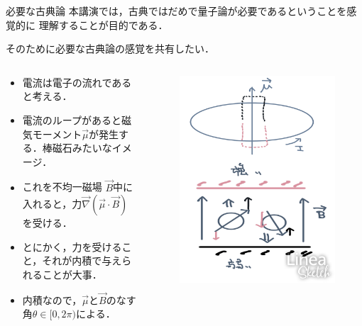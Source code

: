 \documentclass[dvipdfmx]{beamer}
\theoremstyle{break}
\begin{document}
\begin{frame}{必要な古典論}
		本講演では，古典ではだめで量子論が必要であるということを感覚的に
		理解することが目的である．

		そのために必要な古典論の感覚を共有したい．

		\begin{columns}
				\begin{column}{0.7\textwidth}
						\begin{itemize}
								\item 電流は電子の流れであると考える．
								\item 電流のループがあると磁気モーメント$\vec{\mu}$が発生する．棒磁石みたいなイメージ．
								\item これを不均一磁場
										$\vec{B}$中に入れると，力$\vec{\nabla}(\vec{\mu}\cdot\vec{B})$を受ける．
								\item とにかく，\alert{力を受ける}こと，それが\alert{内積}で与えられることが大事．
								\item 内積なので，$\vec{\mu}$と$\vec{B}$のなす角$\theta\in[0, 2\pi)$による．
						\end{itemize}
				\end{column}
				\begin{column}{0.3\textwidth}
						\begin{figure}
								\centering
								\includegraphics[scale=0.13, keepaspectratio]{./img/sg.png}

\end{figure}
\end{column}
\end{columns}
\end{frame}
\end{document}
